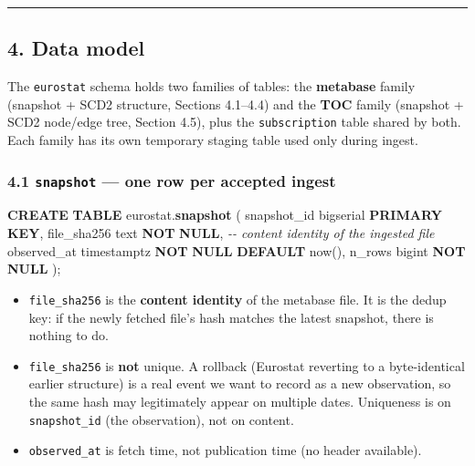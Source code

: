 \documentclass[
]{article}
\newenvironment{Shaded}{\begin{snugshade}}{\end{snugshade}}
\newcommand{\CommentTok}[1]{\textcolor[rgb]{0.56,0.35,0.01}{\textit{#1}}}
\newcommand{\KeywordTok}[1]{\textcolor[rgb]{0.13,0.29,0.53}{\textbf{#1}}}
\newcommand{\NormalTok}[1]{#1}
\providecommand{\tightlist}{%
  \setlength{\itemsep}{0pt}\setlength{\parskip}{0pt}}
\begin{document}
\begin{center}\rule{0.5\linewidth}{0.5pt}\end{center}

\subsection{4. Data model}\label{data-model}

The \texttt{eurostat} schema holds two families of tables: the
\textbf{metabase} family (snapshot + SCD2 structure, Sections 4.1--4.4)
and the \textbf{TOC} family (snapshot + SCD2 node/edge tree, Section
4.5), plus the \texttt{subscription} table shared by both. Each family
has its own temporary staging table used only during ingest.

\subsubsection{\texorpdfstring{4.1 \texttt{snapshot} --- one row per
accepted
ingest}{4.1 snapshot --- one row per accepted ingest}}\label{snapshot-one-row-per-accepted-ingest}

\begin{Shaded}
\begin{Highlighting}[]
\KeywordTok{CREATE} \KeywordTok{TABLE}\NormalTok{ eurostat.}\KeywordTok{snapshot}\NormalTok{ (}
\NormalTok{  snapshot\_id bigserial }\KeywordTok{PRIMARY} \KeywordTok{KEY}\NormalTok{,}
\NormalTok{  file\_sha256 text }\KeywordTok{NOT} \KeywordTok{NULL}\NormalTok{,          }\CommentTok{{-}{-} content identity of the ingested file}
\NormalTok{  observed\_at timestamptz }\KeywordTok{NOT} \KeywordTok{NULL} \KeywordTok{DEFAULT}\NormalTok{ now(),}
\NormalTok{  n\_rows      bigint }\KeywordTok{NOT} \KeywordTok{NULL}
\NormalTok{);}
\end{Highlighting}
\end{Shaded}

\begin{itemize}
\tightlist
\item
  \texttt{file\_sha256} is the \textbf{content identity} of the metabase
  file. It is the dedup key: if the newly fetched file's hash matches
  the latest snapshot, there is nothing to do.
\item
  \texttt{file\_sha256} is \textbf{not} unique. A rollback (Eurostat
  reverting to a byte-identical earlier structure) is a real event we
  want to record as a new observation, so the same hash may legitimately
  appear on multiple dates. Uniqueness is on \texttt{snapshot\_id} (the
  observation), not on content.
\item
  \texttt{observed\_at} is fetch time, not publication time (no header
  available).
\end{itemize}
\end{document}
